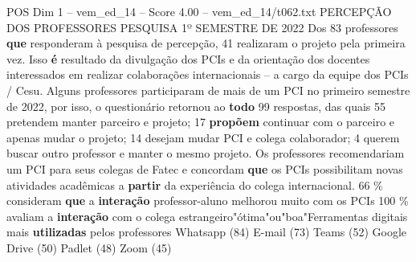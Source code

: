 \begin{textsample}{POS Dim 1 – vem\_ed\_14 – Score 4.00 – vem\_ed\_14/t062.txt}  \label{ex:f1_pos_154}
PERCEPÇÃO DOS PROFESSORES PESQUISA 1º SEMESTRE DE 2022 Dos 83 professores \textbf{que} responderam à pesquisa de percepção, 41 realizaram o projeto pela primeira vez.
Isso \textbf{é} resultado da divulgação dos PCIs e da orientação dos docentes interessados em realizar colaborações internacionais – a cargo da equipe dos PCIs / Cesu.
Alguns professores participaram de mais de um PCI no primeiro semestre de 2022, por isso, o questionário retornou ao \textbf{todo} 99 respostas, das quais 55 pretendem manter parceiro e projeto; 17 \textbf{propõem} continuar com o parceiro e apenas mudar o projeto; 14 desejam mudar PCI e colega colaborador; 4 querem buscar outro professor e manter o mesmo projeto.
Os professores recomendariam um PCI para seus colegas de Fatec e concordam \textbf{que} os PCIs possibilitam novas atividades acadêmicas a \textbf{partir} da experiência do colega internacional. 66 \% consideram \textbf{que} a \textbf{interação} professor-aluno melhorou muito com os PCIs 100 \% avaliam a \textbf{interação} com o colega estrangeiro"ótima"ou"boa"Ferramentas digitais mais \textbf{utilizadas} pelos professores Whatsapp (84) E-mail (73) Teams (52) Google Drive (50) Padlet (48) Zoom (45)

\end{textsample}
